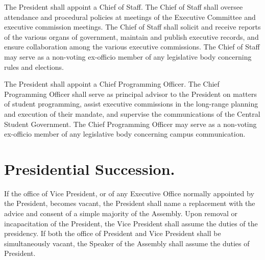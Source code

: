     The President shall appoint a Chief of Staff. The Chief of Staff shall oversee attendance and procedural policies at meetings of the Executive Committee and executive commission meetings. The Chief of Staff shall solicit and receive reports of the various organs of government, maintain and publish executive records, and ensure collaboration among the various executive commissions. The Chief of Staff may serve as a non-voting ex-officio member of any legislative body concerning rules and elections.

    The President shall appoint a Chief Programming Officer. The Chief Programming Officer shall serve as principal advisor to the President on matters of student programming, assist executive commissions in the long-range planning and execution of their mandate, and supervise the communications of the Central Student Government. The Chief Programming Officer may serve as a non-voting ex-officio member of any legislative body concerning campus communication.


\section{Presidential Succession.}
    If the office of Vice President, or of any Executive Office normally appointed by the President, becomes vacant, the President shall name a replacement with the advice and consent of a simple majority of the Assembly. Upon removal or incapacitation of the President, the Vice President shall assume the duties of the presidency. If both the office of President and Vice President shall be simultaneously vacant, the Speaker of the Assembly shall assume the duties of President.
